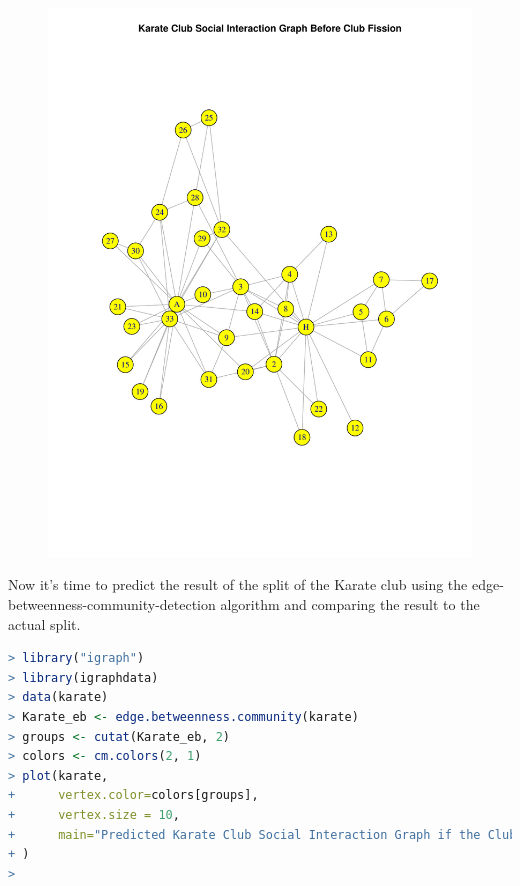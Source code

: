 \documentclass[a4paper, 11pt]{article}
\begin{document}
\begin{figure}[H]
\centering
\includegraphics[scale=0.7]{before.pdf}
\end{figure}

\pagebreak

Now it's time to predict the result of the split of the Karate club using the edge-betweenness-community-detection algorithm and comparing the result to the actual split.

\begin{lstlisting}[language=R, breakatwhitespace=〈false), label=Predicted Karate Club Social Interaction Graph if the Club splits into 2 groups in R, caption= Predicted Karate Club Social Interaction Graph if the Club splits into 2 groups in R]
> library("igraph")
> library(igraphdata)
> data(karate)
> Karate_eb <- edge.betweenness.community(karate)
> groups <- cutat(Karate_eb, 2)
> colors <- cm.colors(2, 1)
> plot(karate, 
+      vertex.color=colors[groups],
+      vertex.size = 10,
+      main="Predicted Karate Club Social Interaction Graph if the Club splits into 2 groups"
+ )
>
\end{lstlisting}
\end{document}

